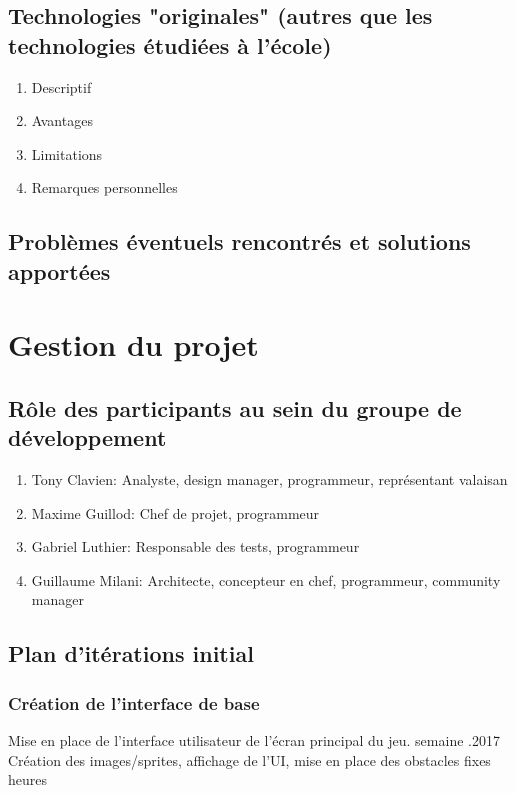 \documentclass[a4paper,11pt]{article}
\begin{document}
	\subsection{Technologies "originales" (autres que les technologies étudiées à l'école)}
	\begin{enumerate}
		\item Descriptif
		\item Avantages
		\item Limitations
		\item Remarques personnelles
	\end{enumerate}
	
	\subsection{Problèmes éventuels rencontrés et solutions apportées}
	
	
	\section{Gestion du projet}
	
	
	\subsection{Rôle des participants au sein du groupe de développement}
	\begin{enumerate}
		\item Tony Clavien: Analyste, design manager, programmeur, représentant valaisan
		\item Maxime Guillod: Chef de projet, programmeur
		\item Gabriel Luthier: Responsable des tests, programmeur
		\item Guillaume Milani: Architecte, concepteur en chef, programmeur, community manager
	\end{enumerate}
	
	\subsection{Plan d'itérations initial}
	
	\subsubsection{Création de l'interface de base}
	\begin{enumerate}[labelwidth=5em,leftmargin=8em]
		\objectif Mise en place de l'interface utilisateur de l'écran principal du jeu.
		 semaine
		.2017
		\partageTache Création des images/sprites, affichage de l'UI, mise en place des obstacles fixes
		 heures
	\end{enumerate}
\end{document}
